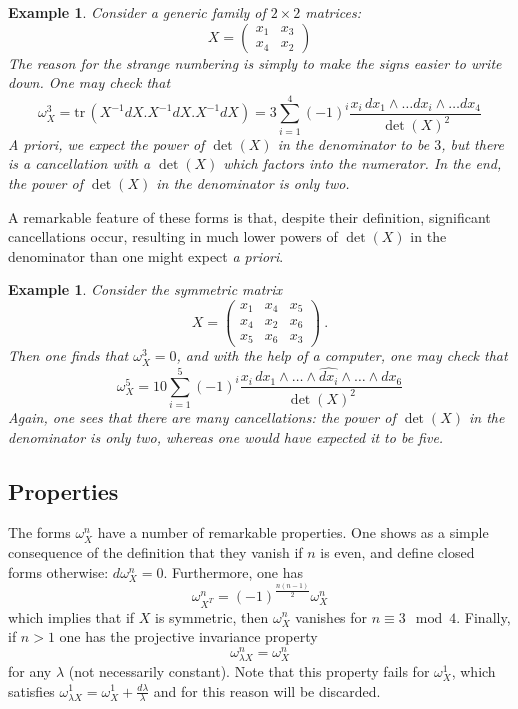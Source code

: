 \documentclass[12pt]{amsart}
\newcommand{\tr}{\mathrm{tr}\,}
\theoremstyle{plain}
\newtheorem{ex}[thm]{Example}
\newcommand{\0}{\color{blue}{\mathsf{0}}}
\begin{document}
\begin{ex}
Consider a generic family of $2\times 2$ matrices: 
\[ X= \begin{pmatrix} x_1 & x_3 \\ x_4 & x_2 \end{pmatrix} 
\]
The reason for the strange numbering is simply to make the signs easier to write down. One may check that 
\[ \omega^3_X = \tr (X^{-1} dX. X^{-1} dX . X^{-1} dX)  = 3  \sum_{i=1}^4 (-1)^i   \frac{  x_i 
\, dx_1 \wedge \ldots \widehat{dx_i} \wedge \ldots dx_4  }{ \det(X)^2}\]
\emph{A priori}, we expect  the power of $\det(X)$ in the denominator to be $3$, but there is a cancellation with a $\det(X)$ which factors into  the numerator. In the end, the power of $\det(X)$ in the denominator is only two.   
\end{ex}
A remarkable feature of these forms is that, despite their definition, significant cancellations occur, resulting in much lower powers of $\det(X)$  in the denominator than one might expect \emph{a priori}.

\begin{ex} \label{ex: omega5rank3} 
Consider the symmetric matrix
\[ X = \begin{pmatrix}   
x_1 & x_4 & x_5 \\
 x_4 & x_2 & x_6 \\
 x_5 & x_6 & x_3 
 \end{pmatrix}\ .
 \] 
 Then one finds that $\omega^3_X=0$, and with the help of a computer, one may check that 
 \begin{equation}  \omega^5_X=  10 \sum_{i=1}^5  (-1)^i  \frac{ x_i\, dx_1 \wedge \ldots \wedge \widehat{ dx_i} \wedge \ldots \wedge dx_{6} }{ \det(X)^2} 
 \end{equation}
 Again, one sees that there are many    cancellations: the power of $\det(X)$ in the denominator is only two, whereas one would have expected it to be five.
\end{ex}

\subsection{Properties}
The forms $\omega_X^n$ have a number of remarkable properties.  One shows as a simple  consequence  of the definition that they vanish if $n$ is even, and define closed forms otherwise: $d \omega_X^n=0$.  Furthermore, one has
\[ \omega^n_{X^T} = (-1)^{\frac{n(n-1)}{2}}\omega^n_X\]
which implies that if $X$ is symmetric, then $\omega^n_X$ vanishes for $n\equiv 3 \mod 4$. 
Finally, if $n>1$ one has the projective invariance property
\[ \omega^n_{\lambda X} = \omega^n_X\]
for any $\lambda$ (not necessarily constant). Note that this property fails for $\omega^1_X$, which satisfies $\omega^1_{\lambda X } = \omega^1_X + \frac{d \lambda}{\lambda}$ and for this reason will be discarded.
\end{document}
